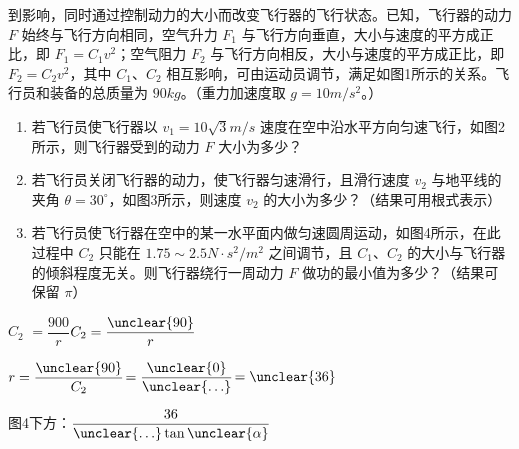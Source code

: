 \begin{problem}
到影响，同时通过控制动力的大小而改变飞行器的飞行状态。已知，飞行器的动力 $F$ 始终与飞行方向相同，空气升力 $F_1$ 与飞行方向垂直，大小与速度的平方成正比，即 $F_1=C_1v^2$；空气阻力 $F_2$ 与飞行方向相反，大小与速度的平方成正比，即 $F_2=C_2v^2$，其中 $C_1$、$C_2$ 相互影响，可由运动员调节，满足如图1所示的关系。飞行员和装备的总质量为 $90\unit{kg}$。（重力加速度取 $g=10\unit{m/s^2}$。）
\begin{enumerate}[label=（\arabic*）]
\item 若飞行员使飞行器以 $v_1=10\sqrt{3}\unit{m/s}$ 速度在空中沿水平方向匀速飞行，如图2所示，则飞行器受到的动力 $F$ 大小为多少？
\item 若飞行员关闭飞行器的动力，使飞行器匀速滑行，且滑行速度 $v_2$ 与地平线的夹角 $\theta=30^\circ$，如图3所示，则速度 $v_2$ 的大小为多少？（结果可用根式表示）
\item 若飞行员使飞行器在空中的某一水平面内做匀速圆周运动，如图4所示，在此过程中 $C_2$ 只能在 $1.75\sim2.5\unit{N\cdot s^2/m^2}$ 之间调节，且 $C_1$、$C_2$ 的大小与飞行器的倾斜程度无关。则飞行器绕行一周动力 $F$ 做功的最小值为多少？（结果可保留 $\pi$）
\end{enumerate}
\quad{} %
\par $C_2$\,$\,=\dfrac{900}{r}$\quad{}\quad $C_2=\dfrac{\unclear{90}}{r}$
\par $r=\dfrac{\unclear{90}}{C_2}$\quad $=\dfrac{\unclear{0}}{\unclear{\ldots}}$\quad $=\unclear{36}$
\par 图4下方：$\dfrac{36}{\unclear{\ldots}\tan\unclear{\alpha}}$

\end{problem}

